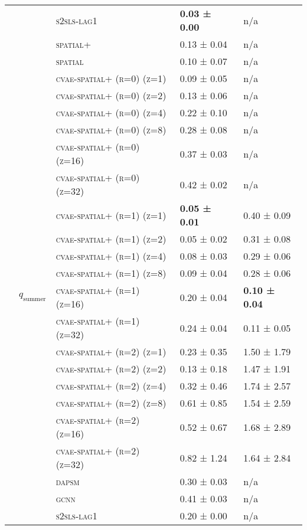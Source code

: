 \documentclass{article}
\begin{document}
\begin{table}[!tbp]
\begin{tabular}{lllll}
 &  & \textsc{s2sls-lag1} & \bf 0.03 ± { 0.00} & n/a \\
 &  & \textsc{spatial+} & 0.13 ± { 0.04} & n/a \\
 &  & \textsc{spatial} & 0.10 ± { 0.07} & n/a \\
\cline{2-5}
 & \multirow[t]{23}{*}{$q_{\text{summer}}$} & \textsc{cvae-spatial+ (r=0) (z=1)} & 0.09 ± { 0.05} & n/a \\
 &  & \textsc{cvae-spatial+ (r=0) (z=2)} & 0.13 ± { 0.06} & n/a \\
 &  & \textsc{cvae-spatial+ (r=0) (z=4)} & 0.22 ± { 0.10} & n/a \\
 &  & \textsc{cvae-spatial+ (r=0) (z=8)} & 0.28 ± { 0.08} & n/a \\
 &  & \textsc{cvae-spatial+ (r=0) (z=16)} & 0.37 ± { 0.03} & n/a \\
 &  & \textsc{cvae-spatial+ (r=0) (z=32)} & 0.42 ± { 0.02} & n/a \\
 &  & \textsc{cvae-spatial+ (r=1) (z=1)} & \bf 0.05 ± { 0.01} & 0.40 ± { 0.09} \\
 &  & \textsc{cvae-spatial+ (r=1) (z=2)} & 0.05 ± { 0.02} & 0.31 ± { 0.08} \\
 &  & \textsc{cvae-spatial+ (r=1) (z=4)} & 0.08 ± { 0.03} & 0.29 ± { 0.06} \\
 &  & \textsc{cvae-spatial+ (r=1) (z=8)} & 0.09 ± { 0.04} & 0.28 ± { 0.06} \\
 &  & \textsc{cvae-spatial+ (r=1) (z=16)} & 0.20 ± { 0.04} & \bf 0.10 ± { 0.04} \\
 &  & \textsc{cvae-spatial+ (r=1) (z=32)} & 0.24 ± { 0.04} & 0.11 ± { 0.05} \\
 &  & \textsc{cvae-spatial+ (r=2) (z=1)} & 0.23 ± { 0.35} & 1.50 ± { 1.79} \\
 &  & \textsc{cvae-spatial+ (r=2) (z=2)} & 0.13 ± { 0.18} & 1.47 ± { 1.91} \\
 &  & \textsc{cvae-spatial+ (r=2) (z=4)} & 0.32 ± { 0.46} & 1.74 ± { 2.57} \\
 &  & \textsc{cvae-spatial+ (r=2) (z=8)} & 0.61 ± { 0.85} & 1.54 ± { 2.59} \\
 &  & \textsc{cvae-spatial+ (r=2) (z=16)} & 0.52 ± { 0.67} & 1.68 ± { 2.89} \\
 &  & \textsc{cvae-spatial+ (r=2) (z=32)} & 0.82 ± { 1.24} & 1.64 ± { 2.84} \\
 &  & \textsc{dapsm} & 0.30 ± { 0.03} & n/a \\
 &  & \textsc{gcnn} & 0.41 ± { 0.03} & n/a \\
 &  & \textsc{s2sls-lag1} & 0.20 ± { 0.00} & n/a \\

\end{tabular}
\end{table}
\end{document}
